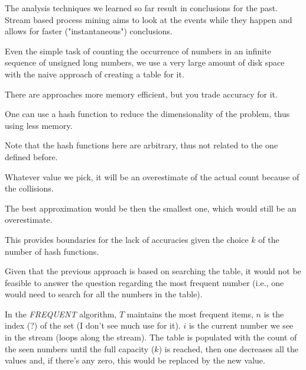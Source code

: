 
\renewcommand\slidesfile{lecture_12_streaming_data.pdf}

\nextslides[slide=5,until=6,highlight=6]

The analysis techniques we learned so far result in conclusions for the past. Stream based process mining aims to look at the events while they happen and allows for faster ("instantaneous") conclusions.

\nextslides[slide=8,until=24,highlight=18]

Even the simple task of counting the occurrence of numbers in an infinite sequence of unsigned long numbers, we use a very large amount of disk space with the naive approach of creating a table for it.

There are approaches more memory efficient, but you trade accuracy for it.

\nextslides[until=27, highlight=27]

One can use a hash function to reduce the dimensionality of the problem, thus using less memory.

\nextslides[until=43,highlight=40]

Note that the hash functions here are arbitrary, thus not related to the one defined before.

Whatever value we pick, it will be an overestimate of the actual count because of the collisions.

\nextslides[until=46,highlight=46]

The best approximation would be then the smallest one, which would still be an overestimate.

\nextslides[slide=48]

This provides boundaries for the lack of accuracies given the choice $k$ of the number of hash functions.

\nextslides[until=59,highlight=50]

Given that the previous approach is based on searching the table, it would not be feasible to answer the question regarding the most frequent number (i.e., one would need to search for all the numbers in the table).

In the \emph{FREQUENT} algorithm, $T$ maintains the most frequent items, $n$ is the index (?) of the set (I don't see much use for it). $i$ is the current number we see in the stream (loops along the stream). The table is populated with the count of the seen numbers until the full capacity ($k$) is reached, then one decreases all the values and, if there's any zero, this would be replaced by the new value.

